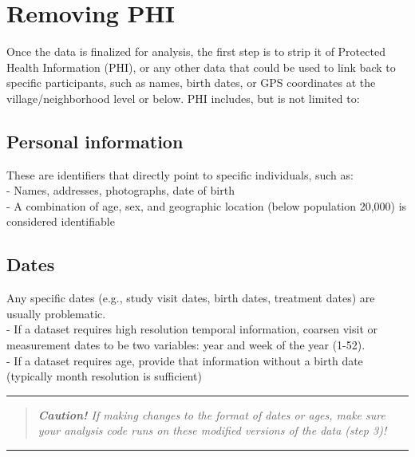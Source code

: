 \documentclass[
]{book}
\begin{document}
\section{Removing PHI}\label{removing-phi}

Once the data is finalized for analysis, the first step is to strip it of Protected Health Information (PHI), or any other data that could be used to link back to specific participants, such as names, birth dates, or GPS coordinates at the village/neighborhood level or below. PHI includes, but is not limited to:

\subsection{Personal information}\label{personal-information}

These are identifiers that directly point to specific individuals, such as:\\
- Names, addresses, photographs, date of birth\\
- A combination of age, sex, and geographic location (below population 20,000) is considered identifiable

\subsection{Dates}\label{dates}

Any specific dates (e.g., study visit dates, birth dates, treatment dates) are usually problematic.\\
- If a dataset requires high resolution temporal information, coarsen visit or measurement dates to be two variables: year and week of the year (1-52).\\
- If a dataset requires age, provide that information without a birth date (typically month resolution is sufficient)

\begin{center}\rule{0.5\linewidth}{0.5pt}\end{center}

\begin{quote}
\emph{\textbf{Caution!} If making changes to the format of dates or ages, make sure your analysis code runs on these modified versions of the data (step 3)! }
\end{quote}

\begin{center}\rule{0.5\linewidth}{0.5pt}\end{center}
\end{document}
